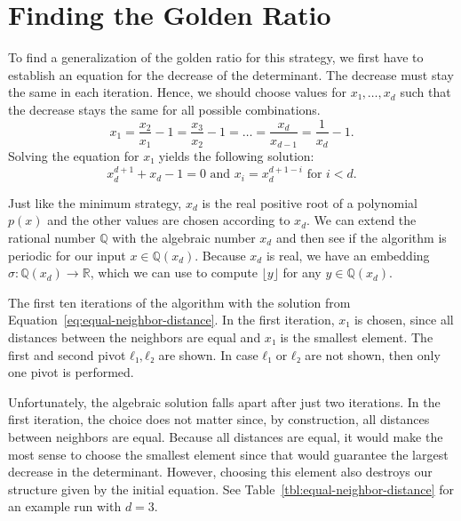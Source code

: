 \section{Finding the Golden Ratio}

To find a generalization of the golden ratio for this strategy,
we first have to establish an equation for the decrease of the determinant.
The decrease must stay the same in each iteration.
Hence, we should choose values for $x₁, \dots, x_d$ such that the decrease
stays the same for all possible combinations.
\begin{equation}
  \label{eq:equal-neighbor-distance}
  x_1 = \frac{x_2}{x_1} - 1 = \frac{x_3}{x_2} - 1 = \dots = \frac{x_d}{x_{d-1}} = \frac{1}{x_d} - 1.
\end{equation}
Solving the equation for $x₁$ yields the following solution:
\[
  x_d^{d+1} + x_d - 1 = 0 \text{ and } x_i = x_d^{d+1-i} \text{ for } i < d.
\]

Just like the minimum strategy, $x_d$ is the real positive root of a polynomial $p(x)$
and the other values are chosen according to $x_d$.
We can extend the rational number $ℚ$ with the algebraic number $x_d$ and then
see if the algorithm is periodic for our input $x ∈ ℚ(x_d)$.
Because $x_d$ is real, we have an embedding $σ \colon ℚ(x_d) → ℝ$,
which we can use to compute $\lfloor y \rfloor$ for any $y ∈ ℚ(x_d)$.

\begin{table}[b]
  \label{tbl:equal-neighbor-distance}
  \caption{
    The first ten iterations of the algorithm with the solution from
    Equation~\ref{eq:equal-neighbor-distance}.
    In the first iteration, $x₁$ is chosen, since all distances between the
    neighbors are equal and $x₁$ is the smallest element.
    The first and second pivot $ℓ₁, ℓ₂$ are shown.
    In case $ℓ₁$ or $ℓ₂$ are not shown, then only one pivot is performed.}
  \centering
  
\end{table}

Unfortunately, the algebraic solution falls apart after just two iterations.
In the first iteration, the choice does not matter since, by construction, all
distances between neighbors are equal.
Because all distances are equal, it would make the most sense to choose the
smallest element since that would guarantee the largest decrease in the
determinant.
However, choosing this element also destroys our structure given by the initial
equation.
See Table~\ref{tbl:equal-neighbor-distance} for an example run with $d = 3$.


